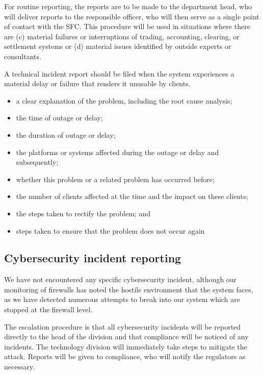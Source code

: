 For routine reporting, the reports are to be made to the department
head, who will deliver reports to the responsible officer, who will
then serve as a single point of contact with the SFC.  This procedure
will be used in situations where there are (c) material failures or
interruptions of trading, accounting, clearing, or settlement systems
or (d) material issues identified by outside experts or consultants.

A technical incident report should be filed when the system
experiences a material delay or failure that renders it unusable by
clients.

\begin{itemize}
\item a clear explanation of the problem, including the root cause analysis;
\item the time of outage or delay;
\item the duration of outage or delay;
\item the platforms or systems affected during the outage or delay and subsequently;
\item whether this problem or a related problem has occurred before;
\item the number of clients affected at the time and the impact on these clients;
\item the steps taken to rectify the problem; and
\item steps taken to ensure that the problem does not occur again
\end{itemize}


\subsection{Cybersecurity incident reporting}

We have not encountered any specific cybersecurity incident, although
our monitoring of firewalls has noted the hostile environment that
the system faces, as we have detected numerous attempts to break into our
system which are stopped at the firewall level.

The escalation procedure is that all cybersecurity incidents will be
reported directly to the head of the division and that compliance will
be noticed of any incidents.  The technology division will immediately
take steps to mitigate the attack.  Reports will be given to
compliance, who will notify the regulators as necessary.


